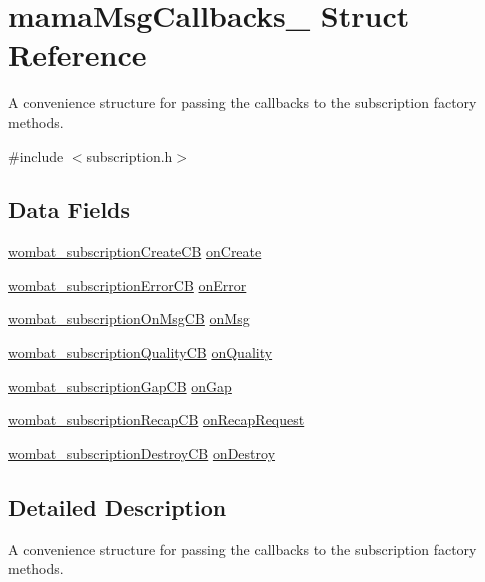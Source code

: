 \hypertarget{structmamaMsgCallbacks__}{
\section{mamaMsgCallbacks\_\- Struct Reference}
\label{structmamaMsgCallbacks__}
}


A convenience structure for passing the callbacks to the subscription factory methods.  


{\ttfamily \#include $<$subscription.h$>$}\subsection*{Data Fields}
\begin{DoxyCompactItemize}
\item 
\hyperlink{subscription_8h_a715ec03b0314ebe01a1f70b6d61c8a3d}{wombat\_\-subscriptionCreateCB} \hyperlink{structmamaMsgCallbacks___a78bd69ec1aad33f9470ce7a7cf27ea60}{onCreate}
\item 
\hyperlink{subscription_8h_af39bb2725f441fddc140d361d6e2a2b2}{wombat\_\-subscriptionErrorCB} \hyperlink{structmamaMsgCallbacks___af04d8365efe0341b405eebf9dade173e}{onError}
\item 
\hyperlink{subscription_8h_a3b2741f3f37684f44fec315aec0d5017}{wombat\_\-subscriptionOnMsgCB} \hyperlink{structmamaMsgCallbacks___a91af0b82a89378a91114e797577a27d9}{onMsg}
\item 
\hyperlink{subscription_8h_ababce27e80aacc6efad3cf52b31813c9}{wombat\_\-subscriptionQualityCB} \hyperlink{structmamaMsgCallbacks___a77c4209108b30e5e0ba904c6f3f6d67b}{onQuality}
\item 
\hyperlink{subscription_8h_af47047b96f723f4cb9ccb51bc614dba0}{wombat\_\-subscriptionGapCB} \hyperlink{structmamaMsgCallbacks___ad81145098f8a8b92419b9490eba59ba9}{onGap}
\item 
\hyperlink{subscription_8h_aa164122aefdee679a4ddd9f2ed886e01}{wombat\_\-subscriptionRecapCB} \hyperlink{structmamaMsgCallbacks___ad8879f88eea7e053185eeead834ecd85}{onRecapRequest}
\item 
\hyperlink{subscription_8h_a9a5da58e7f8781dabdf067beeeac2521}{wombat\_\-subscriptionDestroyCB} \hyperlink{structmamaMsgCallbacks___a3ccdc74110a7ed9cfb5d96646144f21d}{onDestroy}
\end{DoxyCompactItemize}


\subsection{Detailed Description}
A convenience structure for passing the callbacks to the subscription factory methods. 

